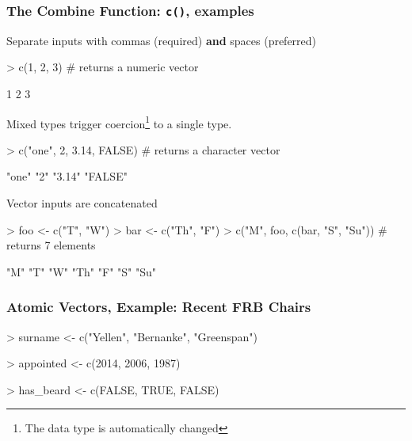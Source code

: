 \documentclass{beamer}
\newcommand{\R}[1]{\texttt{#1}}
\begin{document}
\begin{frame}[fragile]
\frametitle{The Combine Function: \R{c()}, examples}

Separate inputs with commas (required) \textbf{and} spaces (preferred)
\begin{Schunk}
\begin{Sinput}
> c(1, 2, 3) # returns a numeric vector
\end{Sinput}
\end{Schunk}
\pause
\begin{Schunk}
\begin{Soutput}
[1] 1 2 3
\end{Soutput}
\end{Schunk}
\pause
Mixed types trigger coercion\footnote{The data type is automatically changed} to a single type. 
\begin{Schunk}
\begin{Sinput}
> c("one", 2, 3.14, FALSE)  # returns a character vector
\end{Sinput}
\end{Schunk}
\pause
\begin{Schunk}
\begin{Soutput}
[1] "one"   "2"     "3.14"  "FALSE"
\end{Soutput}
\end{Schunk}
\pause
Vector inputs are concatenated 
\begin{Schunk}
\begin{Sinput}
> foo <- c("T", "W")
> bar <- c("Th", "F")
> c("M", foo, c(bar, "S", "Su")) # returns 7 elements 
\end{Sinput}
\end{Schunk}
\pause
\begin{Schunk}
\begin{Soutput}
[1] "M"  "T"  "W"  "Th" "F"  "S"  "Su"
\end{Soutput}
\end{Schunk}
\end{frame}


\begin{frame}[fragile]
\frametitle{Atomic Vectors, Example: Recent FRB Chairs}

\begin{Schunk}
\begin{Sinput}
> surname <- c("Yellen", "Bernanke", "Greenspan")
\end{Sinput}
\end{Schunk}
\pause
\begin{Schunk}
\begin{Sinput}
> appointed <- c(2014, 2006, 1987)
\end{Sinput}
\end{Schunk}
\pause
\begin{Schunk}
\begin{Sinput}
> has_beard <- c(FALSE, TRUE, FALSE)
\end{Sinput}
\end{Schunk}
\end{frame}
\end{document}
